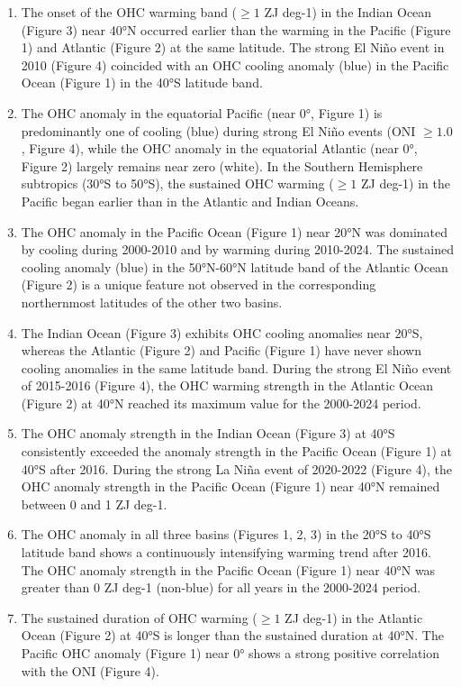 \begin{tcolorbox}[
    breakable,
    title=Example of Experimental Reasoning in Earth,
    colback=LighterGray,
    colframe=DeepPurple,
    colbacktitle=DeepPurple,
    coltitle=White,
]
\begin{enumerate}[label=\Alph*.]
    \item The onset of the OHC warming band ($\geq1$ ZJ deg-1) in the Indian Ocean (Figure 3) near 40°N occurred earlier than the warming in the Pacific (Figure 1) and Atlantic (Figure 2) at the same latitude. The strong El Niño event in 2010 (Figure 4) coincided with an OHC cooling anomaly (blue) in the Pacific Ocean (Figure 1) in the 40°S latitude band.
    \item The OHC anomaly in the equatorial Pacific (near 0°, Figure 1) is predominantly one of cooling (blue) during strong El Niño events (ONI $\ge1.0$, Figure 4), while the OHC anomaly in the equatorial Atlantic (near 0°, Figure 2) largely remains near zero (white). In the Southern Hemisphere subtropics (30°S to 50°S), the sustained OHC warming ($\geq 1$ ZJ deg-1) in the Pacific began earlier than in the Atlantic and Indian Oceans.
    \item The OHC anomaly in the Pacific Ocean (Figure 1) near 20°N was dominated by cooling during 2000-2010 and by warming during 2010-2024. The sustained cooling anomaly (blue) in the 50°N-60°N latitude band of the Atlantic Ocean (Figure 2) is a unique feature not observed in the corresponding northernmost latitudes of the other two basins.
    \item The Indian Ocean (Figure 3) exhibits OHC cooling anomalies near 20°S, whereas the Atlantic (Figure 2) and Pacific (Figure 1) have never shown cooling anomalies in the same latitude band. During the strong El Niño event of 2015-2016 (Figure 4), the OHC warming strength in the Atlantic Ocean (Figure 2) at 40°N reached its maximum value for the 2000-2024 period.
    \item The OHC anomaly strength in the Indian Ocean (Figure 3) at 40°S consistently exceeded the anomaly strength in the Pacific Ocean (Figure 1) at 40°S after 2016. During the strong La Niña event of 2020-2022 (Figure 4), the OHC anomaly strength in the Pacific Ocean (Figure 1) near 40°N remained between 0 and 1 ZJ deg-1.
    \item The OHC anomaly in all three basins (Figures 1, 2, 3) in the 20°S to 40°S latitude band shows a continuously intensifying warming trend after 2016. The OHC anomaly strength in the Pacific Ocean (Figure 1) near 40°N was greater than 0 ZJ deg-1 (non-blue) for all years in the 2000-2024 period.
    \item The sustained duration of OHC warming ($\geq 1$ ZJ deg-1) in the Atlantic Ocean (Figure 2) at 40°S is longer than the sustained duration at 40°N. The Pacific OHC anomaly (Figure 1) near 0° shows a strong positive correlation with the ONI (Figure 4).

\end{enumerate}
\end{tcolorbox}
